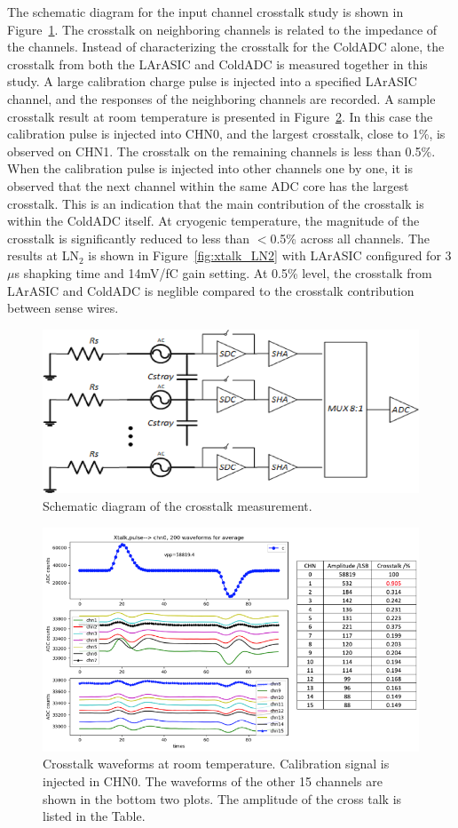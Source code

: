 \label{sec:4.5}
The schematic diagram for the input channel crosstalk study is shown in Figure~\ref{fig:xtalk_schematic}. The crosstalk on neighboring channels is
 related to the impedance of the channels. Instead of characterizing the crosstalk for the ColdADC alone, the 
crosstalk from both the LArASIC and ColdADC is measured together in this study. A large calibration charge 
pulse is injected into a specified LArASIC channel, and the responses of the neighboring channels are recorded. A sample crosstalk result at 
room temperature is presented in Figure~\ref{fig:xtalk_RT}. In this case the calibration pulse is injected into CHN0, and the largest crosstalk, close to 1\%, 
is observed on CHN1. The crosstalk on the remaining channels is less than 0.5\%.  When the calibration pulse 
is injected into other channels one by one, it is observed that the next channel within the same ADC core has the largest crosstalk. 
This is an indication that the main contribution of the crosstalk is within the ColdADC itself. At cryogenic temperature, the magnitude of the 
crosstalk is significantly reduced to less than $<$0.5\% across all channels. The results at LN$_2$ is shown in Figure~\ref{fig:xtalk_LN2} with LArASIC configured
for 3$\mu$s shapking time and 14mV/fC gain setting. At 0.5\% level, the crosstalk from LArASIC and ColdADC is neglible compared to the crosstalk 
contribution between sense wires.
\begin{figure}[h!]
\centering
  \includegraphics[width=0.7\linewidth]{figures/xtalk_schematic.png}
  \caption{Schematic diagram of the crosstalk measurement.}
  \label{fig:xtalk_schematic}
\end{figure}
\begin{figure}[h!]
\centering
  \includegraphics[width=0.7\linewidth]{figures/xtalk_RT.png}
  \caption{Crosstalk waveforms at room temperature. Calibration signal is injected in CHN0. The waveforms of the other 15 channels are shown in the bottom two plots. The amplitude of the cross talk is listed in the Table.}
  \label{fig:xtalk_RT}
\end{figure}
